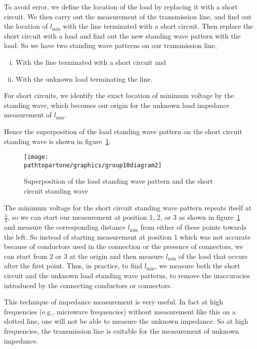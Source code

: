 To avoid error, we define the location of the load by replacing it with a short circuit. We then carry out the measurement of the transmission line, and find out the location of $l_\min$ with the line terminated with a short circuit. Then replace the short circuit with a load and find out the new standing wave pattern with the load. So we have two standing wave patterns on our transmission line,
\begin{enumerate}[(i)]
\item With the line terminated with a short circuit and 
\item With the unknown load terminating the line.
\end{enumerate}
For short circuits, we identify the exact location of minimum voltage by the standing wave, which becomes our origin for the unknown load impedance measurement of $l_\min$.

Hence the superposition of the load standing wave pattern on the short circuit standing wave is shown in figure~\ref{fig:group10diagram2}.
\begin{figure}[h]
\centering
\texttt{[image: \\pathtopartone/graphics/group10diagram2]}
\caption{Superposition of the load standing wave pattern and the short circuit standing wave}
\label{fig:group10diagram2}
\end{figure}

The minimum voltage for the short circuit standing wave pattern repeats itself at $\frac{\lambda}{2}$, so we can start our measurement at position 1, 2, or 3 as shown in figure~\ref{fig:group10diagram2} and measure the corresponding distance $l_\min$ from either of these points towards the left. So instead of starting measurement at position 1 which was not accurate because of conductors used in the connection or the presence of connectors, we can start from 2 or 3 at the origin and then measure $l_\min$ of the load that occurs after the first point. Thus, in practice, to find $l_\min$, we measure both the short circuit and the unknown load standing wave patterns, to remove the inaccuracies introduced by the connecting conductors or connectors.

This technique of impedance measurement is very useful. In fact at high frequencies (e.g., microwave frequencies) without measurement like this on a slotted line, one will not be able to measure the unknown impedance. So at high frequencies, the transmission line is suitable for the measurement of unknown impedance.

